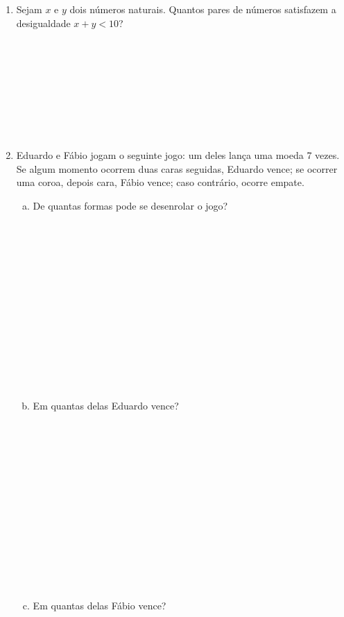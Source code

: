 \documentclass[a4paper,14pt]{article}
\begin{document}
\begin{multicols}{2}
\begin{enumerate}
			\item Sejam $x$ e $y$ dois números naturais. Quantos pares de números satisfazem a desigualdade $x + y < 10$? \\\\\\\\\\\\\\\\\\
			\item Eduardo e Fábio jogam o seguinte jogo: um deles lança uma moeda 7 vezes. Se algum momento ocorrem duas caras seguidas, Eduardo vence; se ocorrer uma coroa, depois cara, Fábio vence; caso contrário, ocorre empate.
			\begin{enumerate}[a)]
				\item De quantas formas pode se desenrolar o jogo? \\\\\\\\\\\\\\\\\\\\\\\\\\\\
				\item Em quantas delas Eduardo vence? \\\\\\\\\\\\\\\\\\\\\\\\\\\\
				\item Em quantas delas Fábio vence? \\\\\\\\\\\\\\\\\\\\\\\\\\\\

\end{enumerate}
\end{enumerate}
\end{multicols}
\end{document}

